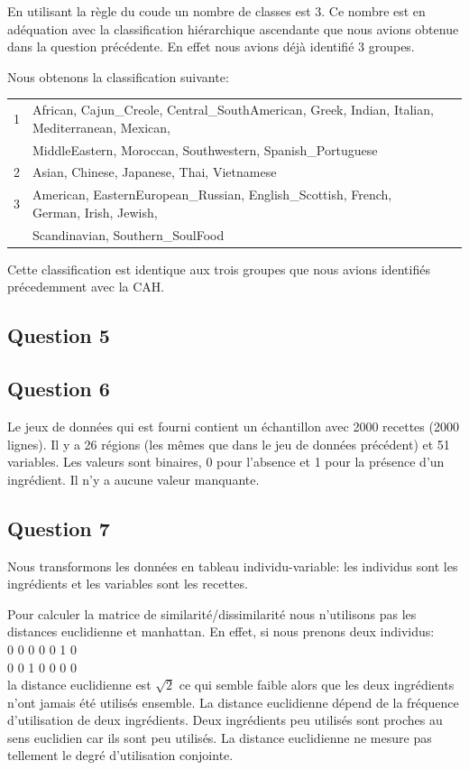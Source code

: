 \documentclass[a4paper,11pt,oneside,roman]{article}
\begin{document}
    En utilisant la règle du coude un nombre de classes est 3.
    Ce nombre est en adéquation avec la classification hiérarchique ascendante que nous avions obtenue dans la question précédente.
    En effet nous avions déjà identifié 3 groupes.

    Nous obtenons la classification suivante:
    \begin{center}
        \begin{tabular}{|l|l|l|}
            \hline
            1 & African, Cajun\_Creole, Central\_SouthAmerican, Greek, Indian, Italian, Mediterranean, Mexican, \\
            & MiddleEastern, Moroccan, Southwestern, Spanish\_Portuguese\\
            \hline
            2 & Asian, Chinese, Japanese, Thai, Vietnamese\\
            \hline
            3 & American, EasternEuropean\_Russian, English\_Scottish, French, German, Irish, Jewish,\\
            & Scandinavian, Southern\_SoulFood\\
            \hline
        \end{tabular}
    \end{center}
    Cette classification est identique aux trois groupes que nous avions identifiés précedemment avec la CAH.

    \subsection*{Question 5}

    \subsection*{Question 6}
    Le jeux de données qui est fourni contient un échantillon avec 2000 recettes (2000 lignes).
    Il y a 26 régions (les mêmes que dans le jeu de données précédent) et 51 variables.
    Les valeurs sont binaires, 0 pour l'absence et 1 pour la présence d'un ingrédient.
    Il n'y a aucune valeur manquante.
    
    \subsection*{Question 7}

    Nous transformons les données en tableau individu-variable: les individus sont les ingrédients et les variables sont les recettes.
   
    Pour calculer la matrice de similarité/dissimilarité nous n'utilisons pas les distances euclidienne et manhattan.
    En effet, si nous prenons deux individus:\\
    0 0 0 0 0 1 0\\
    0 0 1 0 0 0 0\\
    la distance euclidienne est $\sqrt{2}$ ce qui semble faible alors que les deux ingrédients n'ont jamais été utilisés ensemble. 
    La distance euclidienne dépend de la fréquence d'utilisation de deux ingrédients. 
    Deux ingrédients peu utilisés sont proches au sens euclidien car ils sont peu utilisés.
    La distance euclidienne ne mesure pas tellement le degré d'utilisation conjointe.
\end{document}
